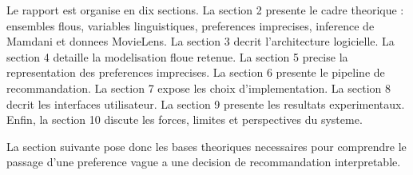 Le rapport est organise en dix sections. La section 2 presente le cadre theorique : ensembles flous, variables linguistiques, preferences imprecises, inference de Mamdani et donnees MovieLens. La section 3 decrit l'architecture logicielle. La section 4 detaille la modelisation floue retenue. La section 5 precise la representation des preferences imprecises. La section 6 presente le pipeline de recommandation. La section 7 expose les choix d'implementation. La section 8 decrit les interfaces utilisateur. La section 9 presente les resultats experimentaux. Enfin, la section 10 discute les forces, limites et perspectives du systeme.

La section suivante pose donc les bases theoriques necessaires pour comprendre le passage d'une preference vague a une decision de recommandation interpretable.
